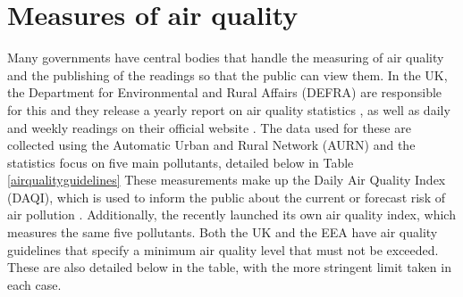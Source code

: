 \documentclass[11pt,twosided,a4paper]{report}
\begin{document}
\section{Measures of air quality} \label{airqualitymeasures}

Many governments have central bodies that handle the measuring of air quality and the publishing of the readings so that the public can view them. In the UK, the Department for Environmental and Rural Affairs (DEFRA) are responsible for this and they release a yearly report on air quality statistics \citep{govuk2017airquality}, as well as daily and weekly readings on their official website \citep{defra2018website}. The data used for these are collected using the Automatic Urban and Rural Network (AURN) and the statistics focus on five main pollutants, detailed below in Table \ref{airqualityguidelines} These measurements make up the Daily Air Quality Index (DAQI), which is used to inform the public about the current or forecast risk of air pollution \citep{defra2018daqi}. Additionally, the \cite{eea2018airqualityindex} recently launched its own air quality index, which measures the same five pollutants. Both the UK and the EEA have air quality guidelines that specify a minimum air quality level that must not be exceeded. These are also detailed below in the table, with the more stringent limit taken in each case.

\end{document}
